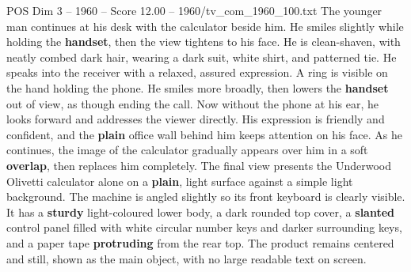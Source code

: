 \begin{textsample}{POS Dim 3 – 1960 – Score 12.00 – 1960/tv\_com\_1960\_100.txt}
The younger man continues at his desk with the calculator beside him.
He smiles slightly while holding the \textbf{handset}, then the view tightens to his face.
He is clean-shaven, with neatly combed dark hair, wearing a dark suit, white shirt, and patterned tie.
He speaks into the receiver with a relaxed, assured expression.
A ring is visible on the hand holding the phone.
He smiles more broadly, then lowers the \textbf{handset} out of view, as though ending the call.
Now without the phone at his ear, he looks forward and addresses the viewer directly.
His expression is friendly and confident, and the \textbf{plain} office wall behind him keeps attention on his face.
As he continues, the image of the calculator gradually appears over him in a soft \textbf{overlap}, then replaces him completely.
The final view presents the Underwood Olivetti calculator alone on a \textbf{plain}, light surface against a simple light background.
The machine is angled slightly so its front keyboard is clearly visible.
It has a \textbf{sturdy} light-coloured lower body, a dark rounded top cover, a \textbf{slanted} control panel filled with white circular number keys and darker surrounding keys, and a paper tape \textbf{protruding} from the rear top.
The product remains centered and still, shown as the main object, with no large readable text on screen.

\end{textsample}
